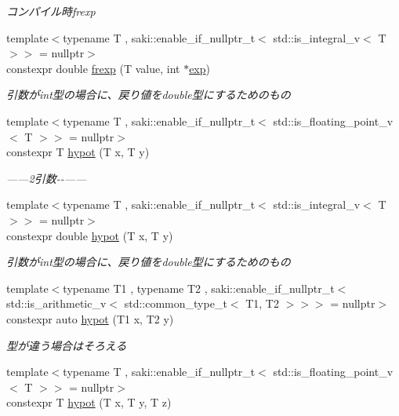 \begin{DoxyCompactItemize}
\begin{DoxyCompactList}\small\item\em コンパイル時frexp \end{DoxyCompactList}\item 
{\footnotesize template$<$typename T , saki\+::enable\+\_\+if\+\_\+nullptr\+\_\+t$<$ std\+::is\+\_\+integral\+\_\+v$<$ T $>$$>$  = nullptr$>$ }\\constexpr double \mbox{\hyperlink{namespacesaki_a915bdd850c89e1ed06c5087790109f11}{frexp}} (T value, int $\ast$\mbox{\hyperlink{namespacesaki_abc1268e543a60d43b04f1418f5ef3e41}{exp}})
\begin{DoxyCompactList}\small\item\em 引数がint型の場合に、戻り値をdouble型にするためのもの \end{DoxyCompactList}\item 
{\footnotesize template$<$typename T , saki\+::enable\+\_\+if\+\_\+nullptr\+\_\+t$<$ std\+::is\+\_\+floating\+\_\+point\+\_\+v$<$ T $>$$>$  = nullptr$>$ }\\constexpr T \mbox{\hyperlink{namespacesaki_a0dfe75bfa0e5223a0390c5e2941e69bc}{hypot}} (T x, T y)
\begin{DoxyCompactList}\small\item\em ------2引数-\/-\/------ \end{DoxyCompactList}\item 
{\footnotesize template$<$typename T , saki\+::enable\+\_\+if\+\_\+nullptr\+\_\+t$<$ std\+::is\+\_\+integral\+\_\+v$<$ T $>$$>$  = nullptr$>$ }\\constexpr double \mbox{\hyperlink{namespacesaki_ad888da163ba5c006d664d564fb48f7a7}{hypot}} (T x, T y)
\begin{DoxyCompactList}\small\item\em 引数がint型の場合に、戻り値をdouble型にするためのもの \end{DoxyCompactList}\item 
{\footnotesize template$<$typename T1 , typename T2 , saki\+::enable\+\_\+if\+\_\+nullptr\+\_\+t$<$ std\+::is\+\_\+arithmetic\+\_\+v$<$ std\+::common\+\_\+type\+\_\+t$<$ T1, T2 $>$$>$$>$  = nullptr$>$ }\\constexpr auto \mbox{\hyperlink{namespacesaki_ae2b457ea76e5aedc8279d8c78a07b26b}{hypot}} (T1 x, T2 y)
\begin{DoxyCompactList}\small\item\em 型が違う場合はそろえる \end{DoxyCompactList}\item 
{\footnotesize template$<$typename T , saki\+::enable\+\_\+if\+\_\+nullptr\+\_\+t$<$ std\+::is\+\_\+floating\+\_\+point\+\_\+v$<$ T $>$$>$  = nullptr$>$ }\\constexpr T \mbox{\hyperlink{namespacesaki_a56768ecf1270205a8c9b3ac8cdf4a590}{hypot}} (T x, T y, T z)

\end{DoxyCompactItemize}

